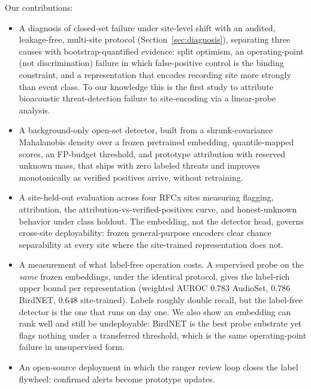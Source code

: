 Our contributions:
\begin{itemize}
\item A diagnosis of closed-set failure under site-level shift with an audited,
      leakage-free, multi-site protocol (Section~\ref{sec:diagnosis}), separating
      three causes with bootstrap-quantified evidence: split optimism, an
      operating-point (not discrimination) failure in which false-positive
      control is the binding constraint, and a representation that encodes
      recording site more strongly than event class. To our knowledge this is the
      first study to attribute bioacoustic threat-detection failure to
      site-encoding via a linear-probe analysis.
\item A background-only open-set detector, built from a shrunk-covariance Mahalanobis
      density over a frozen pretrained embedding, quantile-mapped scores, an
      FP-budget threshold, and prototype attribution with reserved unknown
      mass, that ships with zero labeled threats and improves monotonically
      as verified positives arrive, without retraining.
\item A site-held-out evaluation across four RFCx sites measuring flagging,
      attribution, the attribution-vs-verified-positives curve, and
      honest-unknown behavior under class holdout. The embedding, not the
      detector head, governs cross-site deployability: frozen general-purpose
      encoders clear chance separability at every site where the site-trained
      representation does not.
\item A measurement of what label-free operation costs. A supervised probe on
      the \emph{same} frozen embeddings, under the identical protocol, gives the
      label-rich upper bound per representation (weighted AUROC $0.783$ AudioSet,
      $0.786$ BirdNET, $0.648$ site-trained). Labels roughly double recall, but
      the label-free detector is the one that runs on day one. We also show an
      embedding can rank well and still be undeployable: BirdNET is the best
      probe substrate yet flags nothing under a transferred threshold, which is
      the same operating-point failure in unsupervised form.
\item An open-source deployment in which the ranger review loop
      closes the label flywheel: confirmed alerts become prototype updates.
\end{itemize}

